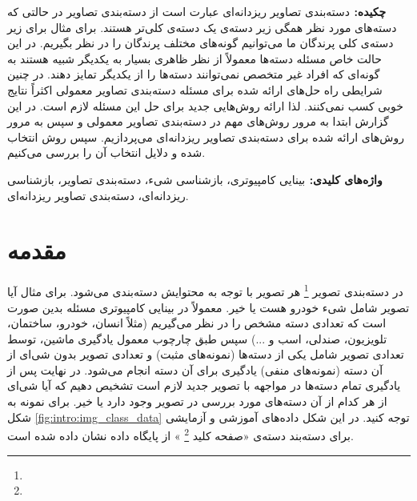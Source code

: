 \documentclass[11pt]{article}
\begin{document}



{\bf {چکيده: }}
دسته‌بندی تصاویر ریزدانه‌ای عبارت است از دسته‌بندی تصاویر در حالتی که دسته‌های مورد نظر همگی زیر دسته‌ی یک دسته‌ی کلی‌تر هستند. برای مثال برای زیر دسته‌ی کلی پرندگان ما می‌توانیم گونه‌های مختلف پرندگان را در نظر بگیریم. در این حالت خاص مسئله دسته‌ها معمولاً از نظر ظاهری بسیار به یکدیگر شبیه هستند به گونه‌ای که افراد غیر متخصص نمی‌توانند دسته‌ها را از یکدیگر تمایز دهند. در چنین شرایطی راه حل‌های ارائه شده برای مسئله دسته‌بندی تصاویر معمولی اکثراً نتایج خوبی کسب نمی‌کنند. لذا ارائه روش‌هایی جدید برای حل این مسئله لازم است.
در این گزارش ابتدا به مرور روش‌های مهم در دسته‌بندی تصاویر معمولی و سپس به مرور روش‌های ارائه شده برای دسته‌بندی تصاویر ریزدانه‌ای می‌پردازیم. سپس روش انتخاب شده و دلایل انتخاب آن را بررسی می‌کنیم.


{\bf  { واژه‌های کلیدی: }}
بینایی کامپیوتری، بازشناسی شیء، دسته‌بندی تصاویر، بازشناسی ریزدانه‌ای، دسته‌بندی تصاویر ریزدانه‌ای.

\setlength{\parindent}{0.25in} %

\section{مقدمه}\label{sec:intro}
در دسته‌بندی تصویر 
\footnote{}
هر تصویر با توجه به محتوایش دسته‌بندی می‌شود. برای مثال آیا تصویر شامل شی‌ء خودرو هست یا خیر. معمولاً در بینایی کامپیوتری مسئله بدین صورت است که تعدادی دسته مشخص را در نظر می‌گیریم (مثلاً انسان، خودرو، ساختمان، تلویزیون، صندلی، اسب و ...) سپس طبق چارچوب معمول یادگیری ماشین، توسط تعدادی تصویر شامل یکی از دسته‌ها (نمونه‌های مثبت) و تعدادی تصویر بدون شی‌ای از آن دسته (نمونه‌های منفی) یادگیری برای آن دسته انجام می‌شود. در نهایت پس از یادگیری تمام دسته‌ها در مواجهه با تصویر جدید لازم است تشخیص دهیم که آیا شی‌ای از هر کدام از آن دسته‌های مورد بررسی در تصویر وجود دارد یا خیر.
برای نمونه به شکل
\ref{fig:intro:img_class_data}
توجه کنید. در این شکل داده‌های آموزشی و آزمایشی برای دسته‌بند دسته‌ی «صفحه کلید
\footnote{}
» از پایگاه داده
 \cite{caltech256}
 نشان داده شده است.
\end{document}
